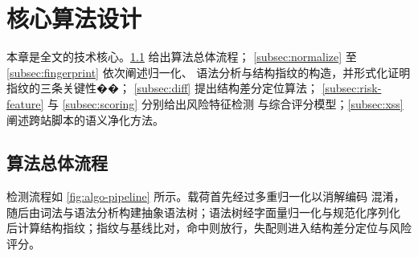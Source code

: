 \section{核心算法设计}
\label{sec:algorithms}

本章是全文的技术核心。\cref{subsec:overview-alg} 给出算法总体流程；
\cref{subsec:normalize} 至 \cref{subsec:fingerprint} 依次阐述归一化、
语法分析与结构指纹的构造，并形式化证明指纹的三条关键性��；
\cref{subsec:diff} 提出结构差分定位算法；
\cref{subsec:risk-feature} 与 \cref{subsec:scoring} 分别给出风险特征检测
与综合评分模型；\cref{subsec:xss} 阐述跨站脚本的语义净化方法。

\subsection{算法总体流程}
\label{subsec:overview-alg}

检测流程如 \cref{fig:algo-pipeline} 所示。载荷首先经过多重归一化以消解编码
混淆，随后由词法与语法分析构建抽象语法树；语法树经字面量归一化与规范化序列化
后计算结构指纹；指纹与基线比对，命中则放行，失配则进入结构差分定位与风险评分。

